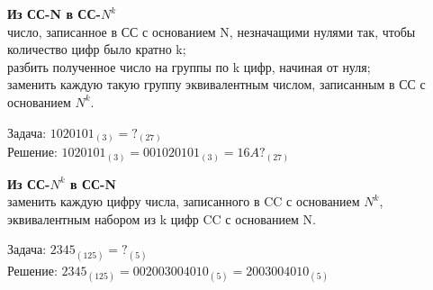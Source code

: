 \small{
\textbf{Из СС-N в СС-$N^{k}$}\\
\textbullet{} число, записанное в СС с основанием N, незначащими нулями так, чтобы количество цифр было кратно k;\\
\textbullet\quad разбить полученное число на группы по k цифр, начиная от нуля;\\
\textbullet\quad заменить каждую такую группу эквивалентным числом, записанным в СС с основанием $N^{k}$.\\
\begin{adjustwidth}{1cm}{0cm}
    Задача: $1020101_{(3)} = ?_{(27)}$\\
    Решение: $1020101_{(3)} = 001 020 101_{(3)} = 16A?_{(27)}$\\
\end{adjustwidth}
\textbf{Из СС-$N^{k}$ в СС-N}\\
\textbullet\quad заменить каждую цифру числа, записанного в CC с основанием $N^{k}$, эквивалентным набором из k цифр CC с основанием N.\\
\begin{adjustwidth}{1cm}{0cm}
    Задача: $2345_{(125)} = ?_{(5)}$\\
Решение: $2345_{(125)} = 002 003 004 010_{(5)} = 2003004010_{(5)}$
\end{adjustwidth}
}